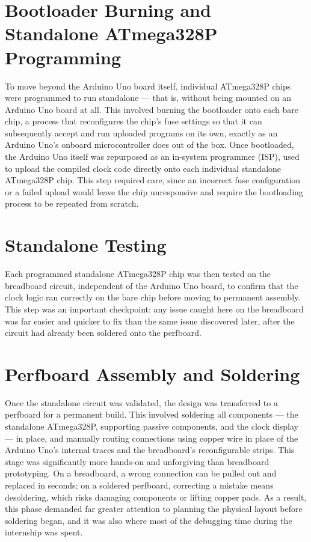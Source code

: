 \documentclass[12pt,a4paper]{report}
\begin{document}
\section{Bootloader Burning and Standalone ATmega328P Programming}
\label{sec:bootloader}
To move beyond the Arduino Uno board itself, individual ATmega328P chips were programmed to run standalone --- that is, without being mounted on an Arduino Uno board at all. This involved burning the bootloader onto each bare chip, a process that reconfigures the chip's fuse settings so that it can subsequently accept and run uploaded programs on its own, exactly as an Arduino Uno's onboard microcontroller does out of the box.
Once bootloaded, the Arduino Uno itself was repurposed as an in-system programmer (ISP), used to upload the compiled clock code directly onto each individual standalone ATmega328P chip. This step required care, since an incorrect fuse configuration or a failed upload would leave the chip unresponsive and require the bootloading process to be repeated from scratch.

\section{Standalone Testing}
\label{sec:standalone}
Each programmed standalone ATmega328P chip was then tested on the breadboard circuit, independent of the Arduino Uno board, to confirm that the clock logic ran correctly on the bare chip before moving to permanent assembly. This step was an important checkpoint: any issue caught here on the breadboard was far easier and quicker to fix than the same issue discovered later, after the circuit had already been soldered onto the perfboard.

\section{Perfboard Assembly and Soldering}
\label{sec:perfboard}
Once the standalone circuit was validated, the design was transferred to a perfboard for a permanent build. This involved soldering all components --- the standalone ATmega328P, supporting passive components, and the clock display --- in place, and manually routing connections using copper wire in place of the Arduino Uno's internal traces and the breadboard's reconfigurable strips.
This stage was significantly more hands-on and unforgiving than breadboard prototyping. On a breadboard, a wrong connection can be pulled out and replaced in seconds; on a soldered perfboard, correcting a mistake means desoldering, which risks damaging components or lifting copper pads. As a result, this phase demanded far greater attention to planning the physical layout before soldering began, and it was also where most of the debugging time during the internship was spent.
\end{document}
